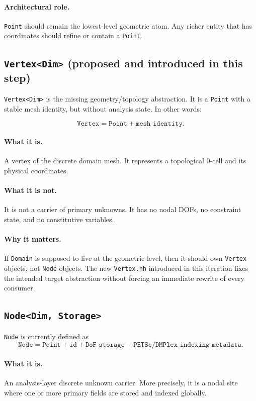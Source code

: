 \paragraph{Architectural role.}
\texttt{Point} should remain the lowest-level geometric atom.  Any richer
entity that has coordinates should refine or contain a \texttt{Point}.


\subsection{\texttt{Vertex<Dim>} (proposed and introduced in this step)}

\texttt{Vertex<Dim>} is the missing geometry/topology abstraction.  It is a
\texttt{Point} with a stable mesh identity, but without analysis state.  In
other words:

\[
\texttt{Vertex} = \texttt{Point} + \texttt{mesh identity}.
\]

\paragraph{What it is.}
A vertex of the discrete domain mesh.  It represents a topological 0-cell and
its physical coordinates.

\paragraph{What it is not.}
It is not a carrier of primary unknowns.  It has no nodal DOFs, no constraint
state, and no constitutive variables.

\paragraph{Why it matters.}
If \texttt{Domain} is supposed to live at the geometric level, then it should
own \texttt{Vertex} objects, not \texttt{Node} objects.  The new
\texttt{Vertex.hh} introduced in this iteration fixes the intended target
abstraction without forcing an immediate rewrite of every consumer.


\subsection{\texttt{Node<Dim, Storage>}}

\texttt{Node} is currently defined as
\[
\texttt{Node} = \texttt{Point} + \texttt{id} + \texttt{DoF storage} +
\texttt{PETSc/DMPlex indexing metadata}.
\]

\paragraph{What it is.}
An analysis-layer discrete unknown carrier.  More precisely, it is a nodal site
where one or more primary fields are stored and indexed globally.


